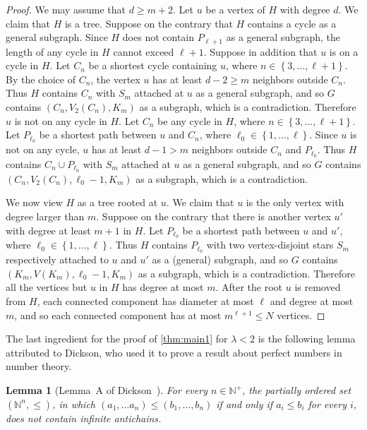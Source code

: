 \documentclass[11pt]{article}
\newtheorem{lemma}[theorem]{Lemma}
\theoremstyle{definition}
\theoremstyle{remark}
\newcommand{\sset}[1]{\left\{{#1}\right\}}
\newcommand{\la}{\lambda}
\newcommand{\N}{\mathbb{N}}
\begin{document}
\begin{proof}
    We may assume that $d \ge m + 2$. Let $u$ be a vertex of $H$ with degree $d$. We claim that $H$ is a tree. Suppose on the contrary that $H$ contains a cycle as a general subgraph. Since $H$ does not contain $P_{\ell + 1}$ as a general subgraph, the length of any cycle in $H$ cannot exceed $\ell + 1$. Suppose in addition that $u$ is on a cycle in $H$. Let $C_n$ be a shortest cycle containing $u$, where $n \in \sset{3, \dots, \ell + 1}$. By the choice of $C_n$, the vertex $u$ has at least $d - 2 \ge m$ neighbors outside $C_n$. Thus $H$ contains $C_n$ with $S_m$ attached at $u$ as a general subgraph, and so $G$ contains $(C_n, V_2(C_n), K_m)$ as a subgraph, which is a contradiction. Therefore $u$ is not on any cycle in $H$. Let $C_n$ be any cycle in $H$, where $n \in \sset{3, \dots, \ell + 1}$. Let $P_{\ell_0}$ be a shortest path between $u$ and $C_n$, where $\ell_0 \in \sset{1, \dots, \ell}$. Since $u$ is not on any cycle, $u$ has at least $d - 1 > m$ neighbors outside $C_n$ and $P_{\ell_0}$. Thus $H$ contains $C_n \cup P_{\ell_0}$ with $S_m$ attached at $u$ as a general subgraph, and so $G$ contains $(C_n, V_2(C_n), \ell_0 - 1, K_m)$ as a subgraph, which is a contradiction.

    We now view $H$ as a tree rooted at $u$. We claim that $u$ is the only vertex with degree larger than $m$. Suppose on the contrary that there is another vertex $u'$ with degree at least $m + 1$ in $H$. Let $P_{\ell_0}$ be a shortest path between $u$ and $u'$, where $\ell_0 \in \sset{1, \dots, \ell}$. Thus $H$ contains $P_{\ell_0}$ with two vertex-disjoint stars $S_m$ respectively attached to $u$ and $u'$ as a (general) subgraph, and so $G$ contains $(K_m, V(K_m), \ell_0 - 1, K_m)$ as a subgraph, which is a contradiction. Therefore all the vertices but $u$ in $H$ has degree at most $m$. After the root $u$ is removed from $H$, each connected component has diameter at most $\ell$ and degree at most $m$, and so each connected component has at most $m^{\ell+1} \le N$ vertices.
\end{proof}

The last ingredient for the proof of \cref{thm:main1} for $\la < 2$ is the following lemma attributed to Dickson, who used it to prove a result about perfect numbers in number theory.

\begin{lemma}[Lemma~A of Dickson~\cite{D13}] \label{lem:dickson}
    For every $n \in \N^+$, the partially ordered set $(\N^n, \le)$, in which $(a_1, \dots a_n) \le (b_1, \dots, b_n)$ if and only if $a_i \le b_i$ for every $i$, does not contain infinite antichains.
\end{lemma}
\end{document}
